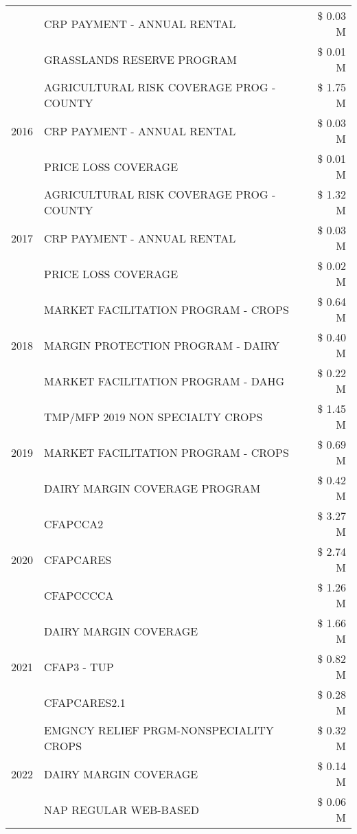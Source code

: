 \begin{tabular}{llr}
 & CRP PAYMENT - ANNUAL RENTAL & \$ 0.03 M \\
 & GRASSLANDS RESERVE PROGRAM & \$ 0.01 M \\
\cline{1-3}
\multirow[t]{3}{*}{2016} & AGRICULTURAL RISK COVERAGE PROG - COUNTY & \$ 1.75 M \\
 & CRP PAYMENT - ANNUAL RENTAL & \$ 0.03 M \\
 & PRICE LOSS COVERAGE & \$ 0.01 M \\
\cline{1-3}
\multirow[t]{3}{*}{2017} & AGRICULTURAL RISK COVERAGE PROG - COUNTY & \$ 1.32 M \\
 & CRP PAYMENT - ANNUAL RENTAL & \$ 0.03 M \\
 & PRICE LOSS COVERAGE & \$ 0.02 M \\
\cline{1-3}
\multirow[t]{3}{*}{2018} & MARKET FACILITATION PROGRAM - CROPS & \$ 0.64 M \\
 & MARGIN PROTECTION PROGRAM - DAIRY & \$ 0.40 M \\
 & MARKET FACILITATION PROGRAM - DAHG & \$ 0.22 M \\
\cline{1-3}
\multirow[t]{3}{*}{2019} & TMP/MFP 2019 NON SPECIALTY CROPS & \$ 1.45 M \\
 & MARKET FACILITATION PROGRAM - CROPS & \$ 0.69 M \\
 & DAIRY MARGIN COVERAGE PROGRAM & \$ 0.42 M \\
\cline{1-3}
\multirow[t]{3}{*}{2020} & CFAPCCA2 & \$ 3.27 M \\
 & CFAPCARES & \$ 2.74 M \\
 & CFAPCCCCA & \$ 1.26 M \\
\cline{1-3}
\multirow[t]{3}{*}{2021} & DAIRY MARGIN COVERAGE & \$ 1.66 M \\
 & CFAP3 - TUP & \$ 0.82 M \\
 & CFAPCARES2.1 & \$ 0.28 M \\
\cline{1-3}
\multirow[t]{3}{*}{2022} & EMGNCY RELIEF PRGM-NONSPECIALITY CROPS & \$ 0.32 M \\
 & DAIRY MARGIN COVERAGE & \$ 0.14 M \\
 & NAP REGULAR WEB-BASED & \$ 0.06 M \\
\cline{1-3}
\bottomrule
\end{tabular}
